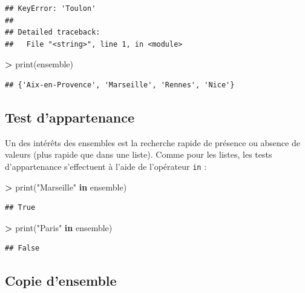 \documentclass[12pt,]{book}
\newenvironment{Shaded}{\begin{snugshade}}{\end{snugshade}}
\newcommand{\KeywordTok}[1]{\textcolor[rgb]{0.13,0.29,0.53}{\textbf{#1}}}
\newcommand{\StringTok}[1]{\textcolor[rgb]{0.31,0.60,0.02}{#1}}
\newcommand{\OperatorTok}[1]{\textcolor[rgb]{0.81,0.36,0.00}{\textbf{#1}}}
\newcommand{\BuiltInTok}[1]{#1}
\newcommand{\NormalTok}[1]{#1}
\numberwithin{equation}{section}
\numberwithin{countremarque}{section}
\begin{document}
\begin{lstlisting}
## KeyError: 'Toulon'
## 
## Detailed traceback: 
##   File "<string>", line 1, in <module>
\end{lstlisting}

\begin{Shaded}
\begin{Highlighting}[]
\OperatorTok{>} \BuiltInTok{print}\NormalTok{(ensemble)}
\end{Highlighting}
\end{Shaded}

\begin{lstlisting}
## {'Aix-en-Provence', 'Marseille', 'Rennes', 'Nice'}
\end{lstlisting}

\subsection{Test d'appartenance}\label{test-dappartenance-1}

Un des intérêts des ensembles est la recherche rapide de présence ou
absence de valeurs (plus rapide que dans une liste). Comme pour les
listes, les tests d'appartenance s'effectuent à l'aide de l'opérateur
\texttt{in} :

\begin{Shaded}
\begin{Highlighting}[]
\OperatorTok{>} \BuiltInTok{print}\NormalTok{(}\StringTok{"Marseille"} \KeywordTok{in}\NormalTok{ ensemble)}
\end{Highlighting}
\end{Shaded}

\begin{lstlisting}
## True
\end{lstlisting}

\begin{Shaded}
\begin{Highlighting}[]
\OperatorTok{>} \BuiltInTok{print}\NormalTok{(}\StringTok{"Paris"} \KeywordTok{in}\NormalTok{ ensemble)}
\end{Highlighting}
\end{Shaded}

\begin{lstlisting}
## False
\end{lstlisting}

\subsection{Copie d'ensemble}\label{copie-densemble}
\end{document}
